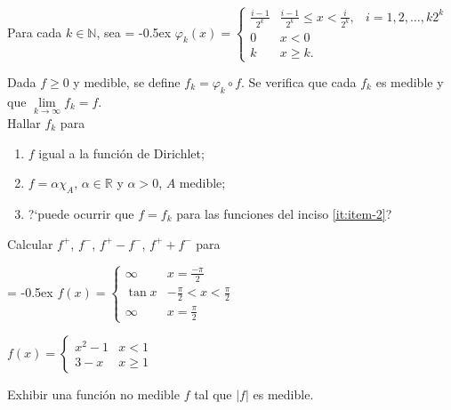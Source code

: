\documentclass{book}
\newcommand{\rr}{\mathbb{R}}
\newcommand{\nn}{\mathbb{N}}
\begin{document}
\begin{ejer}{}
 Para cada $k\in \nn$, sea
 {
\extrarowheight = -0.5ex
\renewcommand{\arraystretch}{1.8}
 $\varphi_k(x)=
 \left\{
 \begin{array}{lll}
  \frac{i-1}{2^k}    & \frac{i-1}{2^k} \leq x< \frac{i}{2^k}, & i=1,2,\ldots,k 2^k
  \\
    0  & x<0 &
    \\
    k &  x\geq k. &
 \end{array}
 \right.$}
 
 Dada $f\geq 0$  y  medible, se define $f_k=\varphi_k \circ f$. 
 Se verifica que cada $f_k$ es medible y que $\lim\limits_{k \to \infty} f_k=f$.
\\
Hallar $f_k$ para 
 \begin{enumerate}
     \item  $f$ igual a la funci\'on de Dirichlet;
     \item\label{it:item-2} $f=\alpha \chi_A$, $\alpha\in \rr$ y $\alpha>0$, $A$ medible;
     \item ?`puede ocurrir que $f=f_k$ para las funciones del inciso \ref{it:item-2}?
 \end{enumerate}
\end{ejer}


\begin{ejer}{} 
Calcular $f^+$, $f^-$, $f^+-f^-$, $f^{+} + f^-$ para
\begin{enumerate}
\item 
{
\extrarowheight = -0.5ex
\renewcommand{\arraystretch}{1.5}
$f(x)=\left\{
\begin{array}{lc}
\infty&x=\frac{-\pi}{2}
\\
\tan x &-\frac{\pi}{2}<x<\frac{\pi}{2}
\\
\infty&x=\frac{\pi}{2}
\end{array}
\right.$
\item $f(x)=\left\{
\begin{array}{ll}
x^2-1&x<1
\\
3-x&x\geq 1
\end{array}
\right.$}
\end{enumerate}
\end{ejer}




\begin{ejer}{} 
Exhibir una función no medible $f$ tal que $|f|$ es medible.
\end{ejer}
\end{document}
